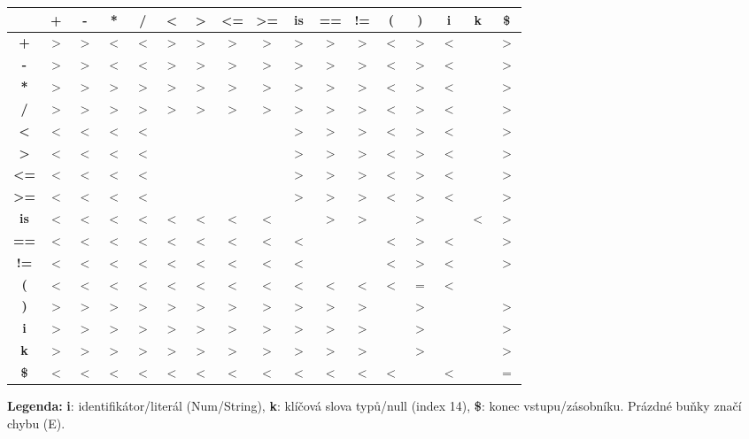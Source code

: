\begin{table}
    \begin{tabular}{|c||c|c|c|c|c|c|c|c|c|c|c|c|c|c|c|c|}
        \hline
        & \textbf{+} & \textbf{-} & \textbf{*} & \textbf{/} & \textbf{<} & \textbf{>} & \textbf{<=} & \textbf{>=} & \textbf{is} & \textbf{==} & \textbf{!=} & \textbf{(} & \textbf{)} & \textbf{i} & \textbf{k} & \textbf{\$} \\
        \hline \hline
        \textbf{+}   & $>$ & $>$ & $<$ & $<$ & $>$ & $>$ & $>$ & $>$ & $>$ & $>$ & $>$ & $<$ & $>$ & $<$ & & $>$ \\ \hline
        \textbf{-}   & $>$ & $>$ & $<$ & $<$ & $>$ & $>$ & $>$ & $>$ & $>$ & $>$ & $>$ & $<$ & $>$ & $<$ & & $>$ \\ \hline
        \textbf{*}   & $>$ & $>$ & $>$ & $>$ & $>$ & $>$ & $>$ & $>$ & $>$ & $>$ & $>$ & $<$ & $>$ & $<$ & & $>$ \\ \hline
        \textbf{/}   & $>$ & $>$ & $>$ & $>$ & $>$ & $>$ & $>$ & $>$ & $>$ & $>$ & $>$ & $<$ & $>$ & $<$ & & $>$ \\ \hline
        \textbf{<}   & $<$ & $<$ & $<$ & $<$ & & & & & $>$ & $>$ & $>$ & $<$ & $>$ & $<$ & & $>$ \\ \hline
        \textbf{>}   & $<$ & $<$ & $<$ & $<$ & & & & & $>$ & $>$ & $>$ & $<$ & $>$ & $<$ & & $>$ \\ \hline
        \textbf{<=}  & $<$ & $<$ & $<$ & $<$ & & & & & $>$ & $>$ & $>$ & $<$ & $>$ & $<$ & & $>$ \\ \hline
        \textbf{>=}  & $<$ & $<$ & $<$ & $<$ & & & & & $>$ & $>$ & $>$ & $<$ & $>$ & $<$ & & $>$ \\ \hline
        \textbf{is}  & $<$ & $<$ & $<$ & $<$ & $<$ & $<$ & $<$ & $<$ & & $>$ & $>$ & & $>$ & & $<$ & $>$ \\ \hline
        \textbf{==}  & $<$ & $<$ & $<$ & $<$ & $<$ & $<$ & $<$ & $<$ & $<$ & & & $<$ & $>$ & $<$ & & $>$ \\ \hline
        \textbf{!=}  & $<$ & $<$ & $<$ & $<$ & $<$ & $<$ & $<$ & $<$ & $<$ & & & $<$ & $>$ & $<$ & & $>$ \\ \hline
        \textbf{(}   & $<$ & $<$ & $<$ & $<$ & $<$ & $<$ & $<$ & $<$ & $<$ & $<$ & $<$ & $<$ & $=$ & $<$ & & \\ \hline
        \textbf{)}   & $>$ & $>$ & $>$ & $>$ & $>$ & $>$ & $>$ & $>$ & $>$ & $>$ & $>$ & & $>$ & & & $>$ \\ \hline
        \textbf{i}   & $>$ & $>$ & $>$ & $>$ & $>$ & $>$ & $>$ & $>$ & $>$ & $>$ & $>$ & & $>$ & & & $>$ \\ \hline
        \textbf{k}   & $>$ & $>$ & $>$ & $>$ & $>$ & $>$ & $>$ & $>$ & $>$ & $>$ & $>$ & & $>$ & & & $>$ \\ \hline
        \textbf{\$}  & $<$ & $<$ & $<$ & $<$ & $<$ & $<$ & $<$ & $<$ & $<$ & $<$ & $<$ & $<$ & & $<$ & & $=$ \\ \hline
    \end{tabular}
    
    \vspace{0.5cm} 
    
    \textbf{Legenda:} \textbf{i}: identifikátor/literál (Num/String), \textbf{k}: klíčová slova typů/null (index 14), \textbf{\$}: konec vstupu/zásobníku. Prázdné buňky značí chybu (E).
\end{table}